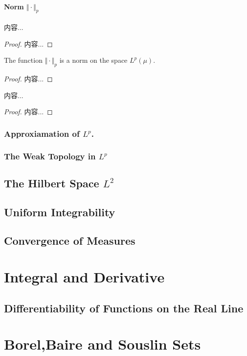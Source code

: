 \documentclass[Total.tex]{subfiles}
\begin{document}
			\subsubsection{Norm $\Vert\cdot\Vert_p$}
			\begin{lemma}
				内容...
			\end{lemma}
			\begin{proof}
				内容...
			\end{proof}
			
			\begin{corollary}
				The function $\Vert\cdot\Vert_p$ is a norm on the space $L^p(\mu)$. 
			\end{corollary}
			\begin{proof}
				内容...
			\end{proof}
			
			\begin{theorem}
				内容...
			\end{theorem}
			\begin{proof}
				内容...
			\end{proof}
			\subsection{Approxiamation of $L^p$.}
			\subsection{The Weak Topology in $L^p$}
		\section{The Hilbert Space $L^2$}
		\section{Uniform Integrability}
		\section{Convergence of Measures}
	\chapter{Integral and Derivative}
		\section{Differentiability of Functions on the Real Line}
	\chapter{Borel,Baire and Souslin Sets}
\end{document}
